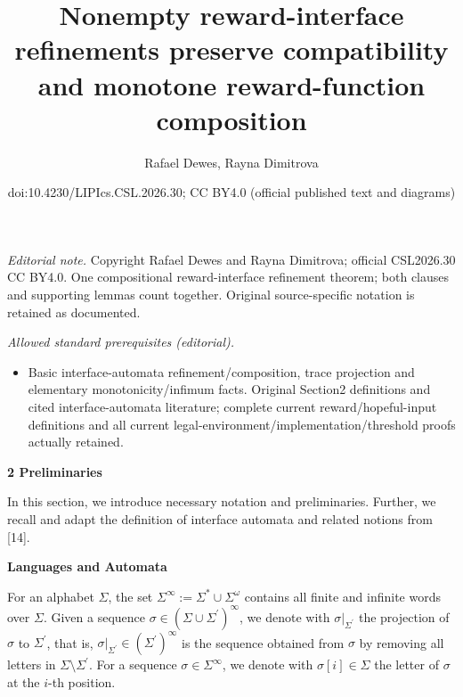 \documentclass[10pt,a4paper]{article}
\title{Nonempty reward-interface refinements preserve compatibility and monotone reward-function composition}
\author{Rafael Dewes, Rayna Dimitrova}
\date{doi:10.4230/LIPIcs.CSL.2026.30; CC BY4.0 (official published text and diagrams)}
\begin{document}
\maketitle
\noindent\textit{Editorial note.} Copyright Rafael Dewes and Rayna Dimitrova; official CSL2026.30 CC BY4.0. One compositional reward-interface refinement theorem; both clauses and supporting lemmas count together. Original source-specific notation is retained as documented.\par\medskip
\noindent\textit{Allowed standard prerequisites (editorial).}\begin{itemize}
\item Basic interface-automata refinement/composition, trace projection and elementary monotonicity/infimum facts. Original Section2 definitions and cited interface-automata literature; complete current reward/hopeful-input definitions and all current legal-environment/implementation/threshold proofs actually retained.
\end{itemize}\medskip

 
\par\medskip\noindent\textbf{2 Preliminaries}\par
 
 
In this section, we introduce necessary notation and preliminaries. Further, we recall and adapt the definition of interface automata and related notions from [14].\par
 
 
 
\par\medskip\noindent\textbf{Languages and Automata}\par
 
 
For an alphabet $\Sigma$, the set $\Sigma^{\infty}:=\Sigma^{*}\cup\Sigma^{\omega}$ contains all finite and infinite words over $\Sigma$. Given a sequence $\sigma\in(\Sigma\cup\Sigma^{\prime})^{\infty}$, we denote with $\sigma|_{\Sigma^{\prime}}$ the projection of $\sigma$ to $\Sigma^{\prime}$, that is, $\sigma|_{\Sigma^{\prime}}\in(\Sigma^{\prime})^{\infty}$ is the sequence obtained from $\sigma$ by removing all letters in $\Sigma\setminus\Sigma^{\prime}$. For a sequence $\sigma\in\Sigma^{\infty}$, we denote with $\sigma[i]\in\Sigma$ the letter of $\sigma$ at the $i$-th position.\par
 
\end{document}
